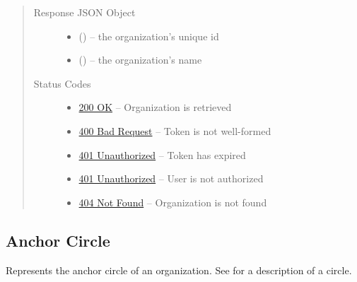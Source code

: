 \documentclass[letterpaper,10pt,english]{sphinxmanual}
\begin{document}
\begin{fulllineitems}
\begin{quote}
\begin{description}
\begin{itemize}
\end{itemize}

\item[{Response JSON Object}] \leavevmode\begin{itemize}
\item {} 
 () -- the organization's unique id

\item {} 
 () -- the organization's name

\end{itemize}

\item[{Status Codes}] \leavevmode\begin{itemize}
\item {} 
\href{http://www.w3.org/Protocols/rfc2616/rfc2616-sec10.html\#sec10.2.1}{200 OK} -- Organization is retrieved

\item {} 
\href{http://www.w3.org/Protocols/rfc2616/rfc2616-sec10.html\#sec10.4.1}{400 Bad Request} -- Token is not well-formed

\item {} 
\href{http://www.w3.org/Protocols/rfc2616/rfc2616-sec10.html\#sec10.4.2}{401 Unauthorized} -- Token has expired

\item {} 
\href{http://www.w3.org/Protocols/rfc2616/rfc2616-sec10.html\#sec10.4.2}{401 Unauthorized} -- User is not authorized

\item {} 
\href{http://www.w3.org/Protocols/rfc2616/rfc2616-sec10.html\#sec10.4.5}{404 Not Found} -- Organization is not found

\end{itemize}

\end{description}\end{quote}

\end{fulllineitems}



\subsection{Anchor Circle}
\label{\detokenize{resources/organization:anchor-circle}}
Represents the anchor circle of an organization. See {\hyperref[\detokenize{resources/circle:circle}]{}} for a description of a circle.
\end{document}
